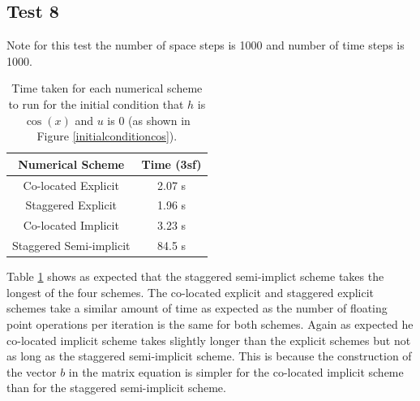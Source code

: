 \documentclass[a4paper,12pt, notitlepage]{article}
\begin{document}
{%

\subsection{Test 8}
Note for this test the number of space steps is 1000 and number of time steps is 1000.
\begin{table}[H]
	\centering
	\begin{tabular}{|c | c|} 
		\hline
		\textbf{Numerical Scheme} & \textbf{Time (3sf)}  \\
		\hline
		Co-located Explicit & 2.07 s \\ 
		\hline
	    Staggered Explicit & 1.96 s \\
		\hline
		Co-located  Implicit & 3.23 s \\
		\hline
		Staggered Semi-implicit & 84.5 s \\
		\hline
	\end{tabular}
\caption{Time taken for each numerical scheme to run for the initial condition that $h$ is $\cos(x)$ and $u$ is $0$ (as shown in Figure \ref{initialconditioncos}).}
\label{timingtable}
\end{table}

Table \ref{timingtable} shows as expected that the staggered semi-implict scheme takes the longest of the four schemes. The co-located explicit and staggered explicit schemes take a similar amount of time as expected as the number of floating point operations per iteration is the same for both schemes. Again as expected he co-located implicit scheme takes slightly longer than the explicit schemes but not as long as the staggered semi-implicit scheme. This is because the construction of the vector $b$ in the matrix equation is simpler for the co-located implicit scheme than for the staggered semi-implicit scheme.

}
\end{document}
